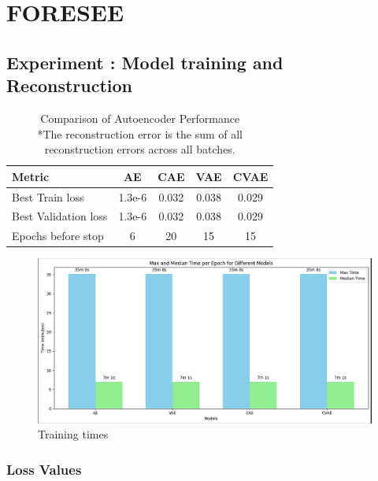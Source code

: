\section{FORESEE}
\label{res:tinydas}


\subsection{Experiment : Model training and Reconstruction}

\begin{table}[!htbp]
    \centering
    \begin{tabular}{lcccc}
        \hline
        \textbf{Metric} & \textbf{AE} & \textbf{CAE} & \textbf{VAE} & \textbf{CVAE} \\
        \hline
        Best Train loss & 1.3e-6 & 0.032 & 0.038 & 0.029 \\
        Best Validation loss & 1.3e-6 & 0.032 & 0.038 & 0.029 \\
        Epochs before stop & 6 & 20 & 15 & 15 \\
        \hline
    \end{tabular}
    \caption{Comparison of Autoencoder Performance\\ *The reconstruction error is the sum of all reconstruction errors across all batches.}
    \label{tab:autoencoder_comparison}
\end{table}

\begin{figure}[!h]
    \centering
    \includegraphics[scale=0.4]{figures/time.png}
    \caption{Training times}
    \label{fig:traintimes}
\end{figure}


\subsubsection{Loss Values}

